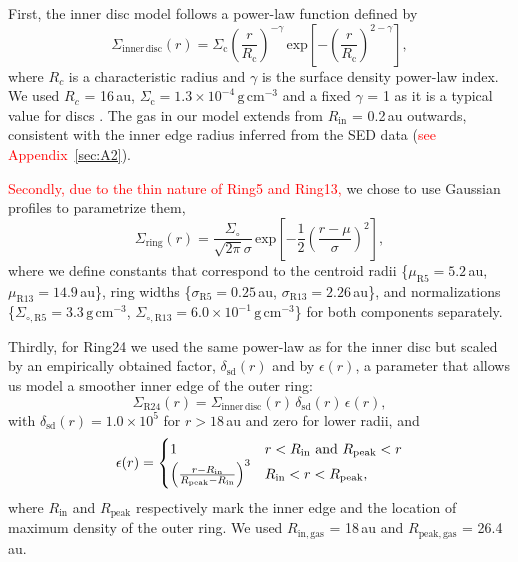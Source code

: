 \documentclass[fleqn,usenatbib,useAMS]{mnras}
\newcommand{\red}[1]{\textcolor{red}{#1}}
\begin{document}
First, the inner disc model follows a power-law function defined by
\begin{equation}
  \Sigma_{\mathrm{inner\,disc}}(r) =\Sigma_\mathrm{c} \left(\frac{r}{R_\mathrm{c}}\right)^{-\gamma}  \, \mathrm{exp}\left[-\left(\frac{r}{R_\mathrm{c}}\right)^{2-\gamma}\right],
\end{equation}
where $R_c$ is a characteristic radius and $\gamma$ is the surface density power-law index. We used $R_c$ = 16\,au, $\Sigma_\mathrm{c} =1.3\times10^{-4}$\,$\mathrm{g\,cm^{-3}}$ and a fixed $\gamma$ = 1 as it is a typical value for discs \citep{Andrews_2009,Andrews_2010}. The gas in our model extends from $R_{\mathrm{in}}$ = 0.2\,au outwards, consistent with the inner edge radius inferred from the SED data (\red{see Appendix~\ref{sec:A2}}).

\red{Secondly, due to the thin nature of Ring5 and Ring13,} we chose to use Gaussian profiles to parametrize them,
\begin{equation}
  \Sigma_{\mathrm{ring}}(r) = \frac{\Sigma_\circ}{\sqrt{2 \pi} \sigma}
  \, \mathrm{exp}\left[-\frac{1}{2}\left(\frac{r-\mu}{\sigma}\right)^{2}\right],
\end{equation}
where we define constants that correspond to the centroid radii \{$\mu_{\mathrm{R5}}=5.2$\,au, $\mu_{\mathrm{R13}}=14.9$\,au\}, ring widths \{$\sigma_{\mathrm{R5}}=0.25$\,au, $\sigma_{\mathrm{R13}}=2.26$\,au\}, and normalizations \{$\Sigma_{\circ,\mathrm{R5}}=3.3$\,$\mathrm{g\,cm^{-3}}$, $\Sigma_{\circ,\mathrm{R13}}=6.0 \times 10^{-1}$\,$\mathrm{g\,cm^{-3}}$\} for both components separately.

Thirdly, for Ring24 we used the same power-law as for the inner disc but scaled by an empirically obtained factor, $\delta_{\mathrm{sd}}(r)$ and by $\epsilon(r)$, a parameter that allows us model a smoother inner edge of the outer ring:
\begin{equation}
  \Sigma_{\mathrm{R24}}(r) = \Sigma_{\mathrm{inner\,disc}}(r)\, \delta_{\mathrm{sd}}(r)\,\epsilon(r),
\end{equation}
with $\delta_{\mathrm{sd}}(r) = 1.0\times 10^5$ for $r > 18$\,au and zero for lower radii, and
\begin{equation}
    \epsilon(r) = 
    \begin{cases}
  1    & r < R_\mathrm{in} \,\, {\rm and} \,\, R_\mathrm{peak} < r \\
  \left(\frac{ r - R_\mathrm{in}}{R_\mathrm{peak} - R_\mathrm{in}}\right)^3 & R_\mathrm{in} < r < R_\mathrm{peak},
    \end{cases}
\end{equation}
where $R_\mathrm{in}$ and $R_\mathrm{peak}$ respectively mark the inner edge and the location of maximum density of the outer ring. We used $R_\mathrm{in,gas}$ = 18\,au and $R_\mathrm{peak,gas}$ = 26.4\,au.
\end{document}
